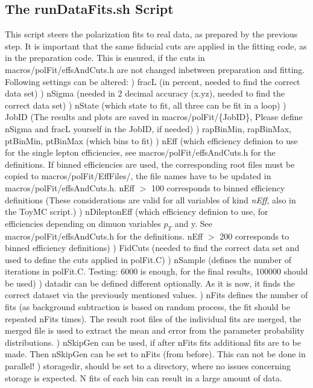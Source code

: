 \documentclass{article}
\begin{document}
\subsection{The runDataFits.sh Script}

This script steers the polarization fits to real data, as prepared by the previous step. It is important that the same fiducial cuts are applied in the fitting code, as in the preparation code. This is ensured, if the cuts in macros/polFit/effsAndCuts.h are not changed inbetween preparation and fitting. Following settings can be altered:
\newline *) fracL (in percent, needed to find the correct data set)
\newline *) nSigma (needed in 2 decimal accuracy (x.yz), needed to find the correct data set)
\newline *) nState (which state to fit, all three can be fit in a loop)
\newline *) JobID (The results and plots are saved in macros/polFit/\{JobID\}, Please define nSigma and fracL yourself in the JobID, if needed)
\newline *) rapBinMin, rapBinMax, ptBinMin, ptBinMax (which bins to fit)
\newline *) nEff (which efficiency definion to use for the single lepton efficiencies, see macros/polFit/effsAndCuts.h for the definitions. If binned efficiencies are used, the corresponding root files must be copied to macros/polFit/EffFiles/, the file names have to be updated in macros/polFit/effsAndCuts.h. nEff $>$ 100 corresponds to binned efficiency definitions (These considerations are valid for all variables of kind \emph{nEff}, also in the ToyMC script.)
\newline *) nDileptonEff (which efficiency definion to use, for efficiencies depending on dimuon variables $p_T$ and y. See macros/polFit/effsAndCuts.h for the definitions. nEff $>$ 200 corresponds to binned efficiency definitions)
\newline *) FidCuts (needed to find the correct data set and used to define the cuts applied in polFit.C)
\newline *) nSample (defines the number of iterations in polFit.C. Testing: 6000 is enough, for the final results, 100000 should be used)
\newline *) datadir can be defined different optionally. As it is now, it finds the correct dataset via the previously mentioned values.
\newline *) nFits defines the number of fits (as background subtraction is based on random process, the fit should be repeated nFits times). The result root files of the individual fits are merged, the merged file is used to extract the mean and error from the parameter probability distributions.
\newline *) nSkipGen can be used, if after nFits fits additional fits are to be made. Then nSkipGen can be set to nFits (from before). This can not be done in parallel!
\newline *) storagedir, should be set to a directory, where no issues concerning storage is expected. N fits of each bin can result in a large amount of data.
\end{document}
